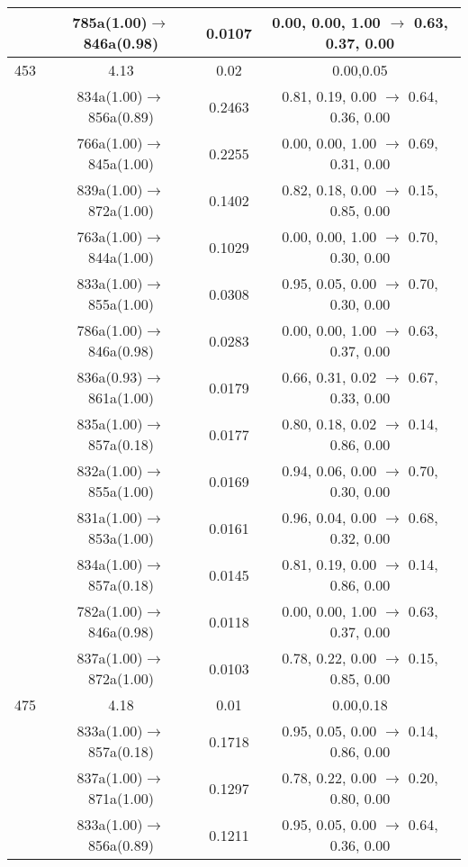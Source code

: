 \documentclass[10pt,a4paper]{article}
\begin{document}
\begin{longtable}{c|c|c|c}
 	& 785a(1.00)$\rightarrow$846a(0.98) &	 0.0107 &	 0.00, 0.00, 1.00 $\rightarrow$ 0.63, 0.37, 0.00 \\ 
 \hline453 &	 4.13 &	 0.02 &	 0.00,0.05 \\ 
  	& 834a(1.00)$\rightarrow$856a(0.89) &	 0.2463 &	 0.81, 0.19, 0.00 $\rightarrow$ 0.64, 0.36, 0.00 \\ 
 	& 766a(1.00)$\rightarrow$845a(1.00) &	 0.2255 &	 0.00, 0.00, 1.00 $\rightarrow$ 0.69, 0.31, 0.00 \\ 
 	& 839a(1.00)$\rightarrow$872a(1.00) &	 0.1402 &	 0.82, 0.18, 0.00 $\rightarrow$ 0.15, 0.85, 0.00 \\ 
 	& 763a(1.00)$\rightarrow$844a(1.00) &	 0.1029 &	 0.00, 0.00, 1.00 $\rightarrow$ 0.70, 0.30, 0.00 \\ 
 	& 833a(1.00)$\rightarrow$855a(1.00) &	 0.0308 &	 0.95, 0.05, 0.00 $\rightarrow$ 0.70, 0.30, 0.00 \\ 
 	& 786a(1.00)$\rightarrow$846a(0.98) &	 0.0283 &	 0.00, 0.00, 1.00 $\rightarrow$ 0.63, 0.37, 0.00 \\ 
 	& 836a(0.93)$\rightarrow$861a(1.00) &	 0.0179 &	 0.66, 0.31, 0.02 $\rightarrow$ 0.67, 0.33, 0.00 \\ 
 	& 835a(1.00)$\rightarrow$857a(0.18) &	 0.0177 &	 0.80, 0.18, 0.02 $\rightarrow$ 0.14, 0.86, 0.00 \\ 
 	& 832a(1.00)$\rightarrow$855a(1.00) &	 0.0169 &	 0.94, 0.06, 0.00 $\rightarrow$ 0.70, 0.30, 0.00 \\ 
 	& 831a(1.00)$\rightarrow$853a(1.00) &	 0.0161 &	 0.96, 0.04, 0.00 $\rightarrow$ 0.68, 0.32, 0.00 \\ 
 	& 834a(1.00)$\rightarrow$857a(0.18) &	 0.0145 &	 0.81, 0.19, 0.00 $\rightarrow$ 0.14, 0.86, 0.00 \\ 
 	& 782a(1.00)$\rightarrow$846a(0.98) &	 0.0118 &	 0.00, 0.00, 1.00 $\rightarrow$ 0.63, 0.37, 0.00 \\ 
 	& 837a(1.00)$\rightarrow$872a(1.00) &	 0.0103 &	 0.78, 0.22, 0.00 $\rightarrow$ 0.15, 0.85, 0.00 \\ 
 \hline475 &	 4.18 &	 0.01 &	 0.00,0.18 \\ 
  	& 833a(1.00)$\rightarrow$857a(0.18) &	 0.1718 &	 0.95, 0.05, 0.00 $\rightarrow$ 0.14, 0.86, 0.00 \\ 
 	& 837a(1.00)$\rightarrow$871a(1.00) &	 0.1297 &	 0.78, 0.22, 0.00 $\rightarrow$ 0.20, 0.80, 0.00 \\ 
 	& 833a(1.00)$\rightarrow$856a(0.89) &	 0.1211 &	 0.95, 0.05, 0.00 $\rightarrow$ 0.64, 0.36, 0.00 \\ 

\end{longtable}
\end{document}

